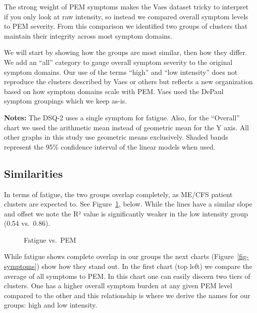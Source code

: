 \documentclass[
  letterpaper,
  DIV=11,
  numbers=noendperiod]{scrartcl}
\begin{document}
The strong weight of PEM symptoms makes the Vaes dataset tricky to
interpret if you only look at raw intensity, so instead we compared
overall symptom levels to PEM severity. From this comparison we
identified two groups of clusters that maintain their integrity across
most symptom domains.

We will start by showing how the groups are most similar, then how they
differ. We add an ``all'' category to gauge overall symptom severity to
the original symptom domains. Our use of the terms ``high'' and ``low
intensity'' does not reproduce the clusters described by Vaes or others
but reflects a new organization based on how symptom domains scale with
PEM. Vaes used the DePaul symptom groupings which we keep as-is.

\textbf{Notes:} The DSQ-2 uses a single symptom for fatigue. Also, for
the ``Overall'' chart we used the arithmetic mean instead of geometric
mean for the Y axis. All other graphs in this study use geometric means
exclusively. Shaded bands represent the 95\% confidence interval of the
linear models when used.

\subsection{Similarities}\label{similarities}

In terms of fatigue, the two groups overlap completely, as ME/CFS
patient clusters are expected to. See Figure~\ref{fig-fatigue}, below.
While the lines have a similar slope and offset we note the R² value is
significantly weaker in the low intensity group (0.54 vs.~0.86).

\begin{figure}[h]


\caption{\label{fig-fatigue}Fatigue vs.~PEM}

\end{figure}%

\FloatBarrier

While fatigue shows complete overlap in our groups the next charts
(Figure~\ref{fig-symptoms}) show how they stand out. In the first chart
(top left) we compare the average of all symptoms to PEM. In this chart
one can easily discern two tiers of clusters. One has a higher overall
symptom burden at any given PEM level compared to the other and this
relationship is where we derive the names for our groups: high and low
intensity.
\end{document}

